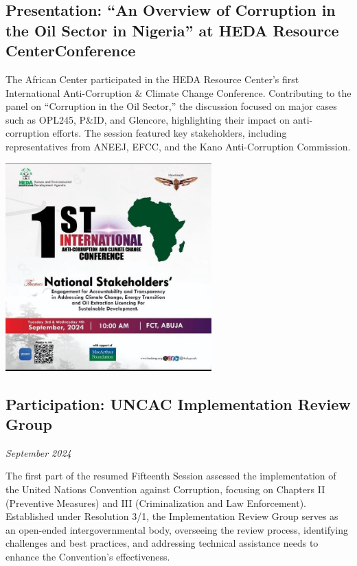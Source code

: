 \documentclass[
  letterpaper,
  DIV=11,
  numbers=noendperiod]{scrreprt}
\begin{document}
\subsection{Presentation: ``An Overview of Corruption in the Oil Sector
in Nigeria'' at HEDA Resource
CenterConference}\label{presentation-an-overview-of-corruption-in-the-oil-sector-in-nigeria-at-heda-resource-centerconference}

The African Center participated in the HEDA Resource Center's first
International Anti-Corruption \& Climate Change Conference. Contributing
to the panel on ``Corruption in the Oil Sector,'' the discussion focused
on major cases such as OPL245, P\&ID, and Glencore, highlighting their
impact on anti-corruption efforts. The session featured key
stakeholders, including representatives from ANEEJ, EFCC, and the Kano
Anti-Corruption Commission.

\begin{center}
\includegraphics[width=3.125in,height=\textheight,keepaspectratio]{images/strengthen/09_oil.png}
\end{center}

\subsection{Participation: UNCAC Implementation Review
Group}\label{participation-uncac-implementation-review-group}

\emph{September 2024}

The first part of the resumed Fifteenth Session assessed the
implementation of the United Nations Convention against Corruption,
focusing on Chapters II (Preventive Measures) and III (Criminalization
and Law Enforcement). Established under Resolution 3/1, the
Implementation Review Group serves as an open-ended intergovernmental
body, overseeing the review process, identifying challenges and best
practices, and addressing technical assistance needs to enhance the
Convention's effectiveness.
\end{document}
